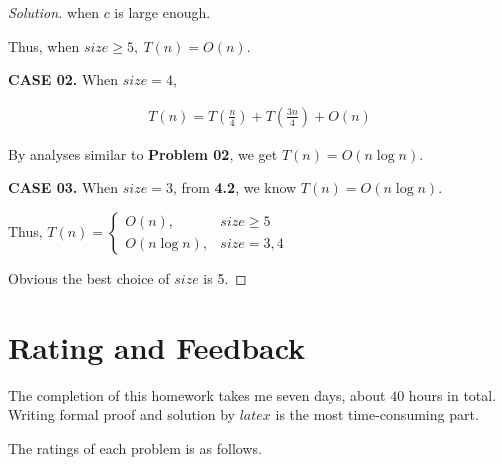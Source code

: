 \documentclass{article}
\newenvironment{solution}{\begin{proof}[\noindent\it Solution]}{\end{proof}}
\begin{document}
\begin{solution}
    \vspace{-1.5em}\hspace{6em}
    when $c$ is large enough.
    
    \hspace{3.9em}
    Thus, when $size\geq5,\ T(n)=O(n).$
    
    \vspace{0.75em} \hspace{1.3em}
    \textbf{CASE 02.} When $size=4$,
    
    \vspace{-2em}
    \begin{align*}
        T(n)=T\left(\frac{n}{4}\right)+T\left(\frac{3n}{4}\right) + O(n)
    \end{align*}
    
    \vspace{-0.5em} \hspace{3.9em}
    By analyses similar to \textbf{Problem 02}, we get $T(n)=O(n\log n).$
    
    \vspace{0.75em} \hspace{1.3em}
    \textbf{CASE 03.} When $size=3$, from \textbf{4.2}, we know $T(n)=O(n\log n).$
    
    \vspace{3em}
    \hspace{1.3em}
    Thus, $T(n)=\left\{
    \begin{array}{ll}
        O(n),  & size\geq 5 \\
        O(n\log n), & size=3,4
    \end{array}\right.$
    
    \vspace{0.75em} \hspace{1.3em}
    Obvious the best choice of $size$ is 5.
\end{solution}


\vspace{3em}
\section{Rating and Feedback}
\vspace{1em} \hspace{1.2em}
The completion of this homework takes me seven days, about $40$ hours in total. Writing formal proof and solution by $latex$ is the most time-consuming part.

The ratings of each problem is as follows.
\end{document}
